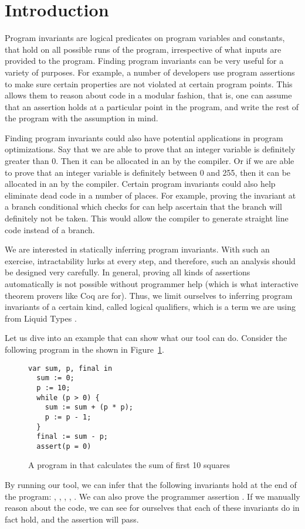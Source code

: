 \section{Introduction}


Program invariants are logical predicates on program variables and constants, that hold on all possible runs of the program, irrespective of what inputs are provided to the program.
Finding program invariants can be very useful for a variety of purposes. 
For example, a number of developers use program assertions to make sure certain properties are not violated at certain program points.
This allows them to reason about code in a modular fashion, that is, one can assume that an assertion holds at a particular point in the program, and write the rest of the program with the assumption in mind. 

Finding program invariants could also have potential applications in program optimizations. 
Say that we are able to prove that an integer variable is definitely greater than 0.
Then it can be allocated in an  by the compiler.
Or if we are able to prove that an integer variable is definitely between 0 and 255, then it can be allocated in an  by the compiler.
Certain program invariants could also help eliminate dead code in a number of places.
For example, proving the invariant  at a branch conditional which checks for  can help ascertain that the  branch will definitely not be taken.
This would allow the compiler to generate straight line code instead of a branch.

We are interested in statically inferring program invariants. 
With such an exercise, intractability lurks at every step, and therefore, such an analysis should be designed very carefully.
In general, proving all kinds of assertions automatically is not possible without programmer help (which is what interactive theorem provers like Coq \cite{Coq} are for).
Thus, we limit ourselves to inferring program invariants of a certain kind, called logical qualifiers, which is a term we are using from Liquid Types \cite{Rondon2008}.

Let us dive into an example that can show what our tool can do.
Consider the following program in the \lang shown in Figure~\ref{fig:sum}.
\begin{figure}
\begin{verbatim}
var sum, p, final in
  sum := 0;
  p := 10;
  while (p > 0) {
    sum := sum + (p * p);
    p := p - 1;
  }
  final := sum - p;
  assert(p = 0)   
\end{verbatim}
\caption{A program in \lang that calculates the sum of first 10 squares}
\label{fig:sum}
\end{figure}
By running our tool, we can infer that the following invariants hold at the end of the program: , , , , . We can also prove the programmer assertion .
If we manually reason about the code, we can see for ourselves that each of these invariants do in fact hold, and the assertion will pass.

